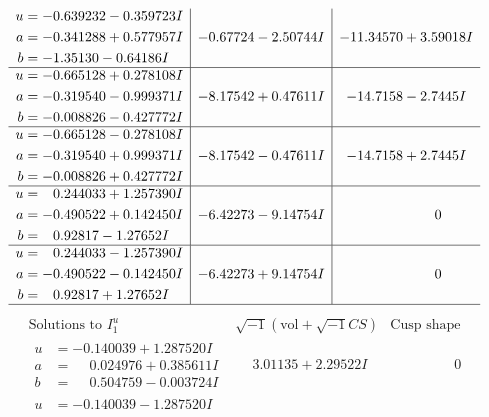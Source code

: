 \documentclass[1p]{elsarticle_modified}
\theoremstyle{definition}
\newcommand{\I}{\sqrt{-1}}
\begin{document}
$$\begin{array}{c|c|c}
\begin{aligned}
u &= -0.639232 - 0.359723 I \\
a &= -0.341288 + 0.577957 I \\
b &= -1.35130 - 0.64186 I\end{aligned}
 & -0.67724 - 2.50744 I & -11.34570 + 3.59018 I \\ \hline\begin{aligned}
u &= -0.665128 + 0.278108 I \\
a &= -0.319540 - 0.999371 I \\
b &= -0.008826 - 0.427772 I\end{aligned}
 & -8.17542 + 0.47611 I & -14.7158 - 2.7445 I \\ \hline\begin{aligned}
u &= -0.665128 - 0.278108 I \\
a &= -0.319540 + 0.999371 I \\
b &= -0.008826 + 0.427772 I\end{aligned}
 & -8.17542 - 0.47611 I & -14.7158 + 2.7445 I \\ \hline\begin{aligned}
u &= \phantom{-}0.244033 + 1.257390 I \\
a &= -0.490522 + 0.142450 I \\
b &= \phantom{-}0.92817 - 1.27652 I\end{aligned}
 & -6.42273 - 9.14754 I & \phantom{-0.000000 } 0 \\ \hline\begin{aligned}
u &= \phantom{-}0.244033 - 1.257390 I \\
a &= -0.490522 - 0.142450 I \\
b &= \phantom{-}0.92817 + 1.27652 I\end{aligned}
 & -6.42273 + 9.14754 I & \phantom{-0.000000 } 0\\
 \hline 
 \end{array}$$\newpage$$\begin{array}{c|c|c}  
\text{Solutions to }I^u_{1}& \I (\text{vol} + \sqrt{-1}CS) & \text{Cusp shape}\\
 \hline 
\begin{aligned}
u &= -0.140039 + 1.287520 I \\
a &= \phantom{-}0.024976 + 0.385611 I \\
b &= \phantom{-}0.504759 - 0.003724 I\end{aligned}
 & \phantom{-}3.01135 + 2.29522 I & \phantom{-0.000000 } 0 \\ \hline\begin{aligned}
u &= -0.140039 - 1.287520 I \\

\end{aligned}
\end{array}$$
\end{document}
